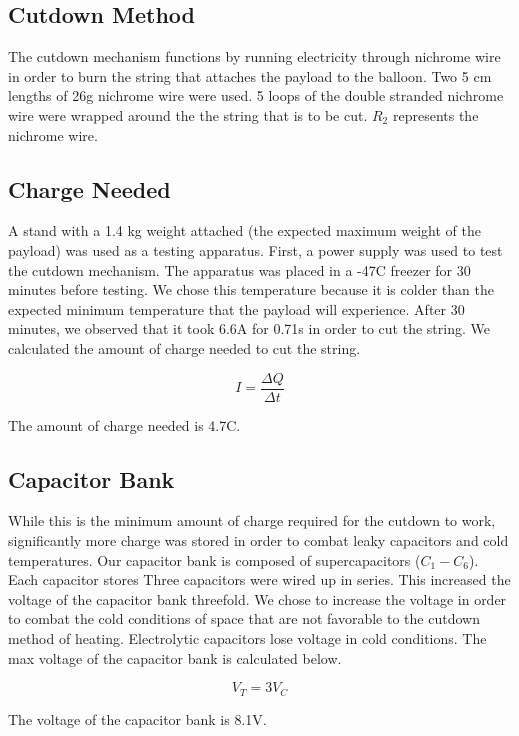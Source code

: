 \documentclass[12pt,]{article}
\begin{document}
\subsection{Cutdown Method}\label{cutdown-method}

The cutdown mechanism functions by running electricity through nichrome
wire in order to burn the string that attaches the payload to the
balloon. Two 5 cm lengths of 26g nichrome wire were used. 5 loops of the
double stranded nichrome wire were wrapped around the the string that is
to be cut. \(R_{2}\) represents the nichrome wire.

\subsection{Charge Needed}\label{charge-needed}

A stand with a 1.4 kg weight attached (the expected maximum weight of
the payload) was used as a testing apparatus. First, a power supply was
used to test the cutdown mechanism. The apparatus was placed in a
-47\degree C freezer for 30 minutes before testing. We chose this
temperature because it is colder than the expected minimum temperature
that the payload will experience. After 30 minutes, we observed that it
took 6.6A for 0.71s in order to cut the string. We calculated the amount
of charge needed to cut the string.

\[I=\frac{\Delta Q}{\Delta t}\]

The amount of charge needed is 4.7C.

\subsection{Capacitor Bank}\label{capacitor-bank}

While this is the minimum amount of charge required for the cutdown to
work, significantly more charge was stored in order to combat leaky
capacitors and cold temperatures. Our capacitor bank is composed of
supercapacitors (\(C_{1}-C_{6}\)). Each capacitor stores Three
capacitors were wired up in series. This increased the voltage of the
capacitor bank threefold. We chose to increase the voltage in order to
combat the cold conditions of space that are not favorable to the
cutdown method of heating. Electrolytic capacitors lose voltage in cold
conditions. The max voltage of the capacitor bank is calculated below.

\[V_{T} = 3V_{C}\]

The voltage of the capacitor bank is 8.1V.
\end{document}
